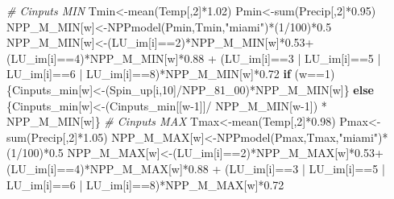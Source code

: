 \documentclass[
  10pt,
  b5paper,
]{book}
\newenvironment{Shaded}{\begin{snugshade}}{\end{snugshade}}
\newcommand{\CommentTok}[1]{\textcolor[rgb]{0.56,0.35,0.01}{\textit{#1}}}
\newcommand{\ControlFlowTok}[1]{\textcolor[rgb]{0.13,0.29,0.53}{\textbf{#1}}}
\newcommand{\DecValTok}[1]{\textcolor[rgb]{0.00,0.00,0.81}{#1}}
\newcommand{\FloatTok}[1]{\textcolor[rgb]{0.00,0.00,0.81}{#1}}
\newcommand{\FunctionTok}[1]{\textcolor[rgb]{0.00,0.00,0.00}{#1}}
\newcommand{\NormalTok}[1]{#1}
\newcommand{\OtherTok}[1]{\textcolor[rgb]{0.56,0.35,0.01}{#1}}
\newcommand{\SpecialCharTok}[1]{\textcolor[rgb]{0.00,0.00,0.00}{#1}}
\newcommand{\StringTok}[1]{\textcolor[rgb]{0.31,0.60,0.02}{#1}}
\begin{document}
\begin{Shaded}
\begin{Highlighting}[]
\CommentTok{\# Cinputs MIN}
\NormalTok{Tmin}\OtherTok{\textless{}{-}}\FunctionTok{mean}\NormalTok{(Temp[,}\DecValTok{2}\NormalTok{]}\SpecialCharTok{*}\FloatTok{1.02}\NormalTok{)}
\NormalTok{Pmin}\OtherTok{\textless{}{-}}\FunctionTok{sum}\NormalTok{(Precip[,}\DecValTok{2}\NormalTok{]}\SpecialCharTok{*}\FloatTok{0.95}\NormalTok{)}
\NormalTok{NPP\_M\_MIN[w]}\OtherTok{\textless{}{-}}\FunctionTok{NPPmodel}\NormalTok{(Pmin,Tmin,}\StringTok{"miami"}\NormalTok{)}\SpecialCharTok{*}\NormalTok{(}\DecValTok{1}\SpecialCharTok{/}\DecValTok{100}\NormalTok{)}\SpecialCharTok{*}\FloatTok{0.5}
\NormalTok{NPP\_M\_MIN[w]}\OtherTok{\textless{}{-}}\NormalTok{(LU\_im[i]}\SpecialCharTok{==}\DecValTok{2}\NormalTok{)}\SpecialCharTok{*}\NormalTok{NPP\_M\_MIN[w]}\SpecialCharTok{*}\FloatTok{0.53}\SpecialCharTok{+}\NormalTok{ (LU\_im[i]}\SpecialCharTok{==}\DecValTok{4}\NormalTok{)}\SpecialCharTok{*}\NormalTok{NPP\_M\_MIN[w]}\SpecialCharTok{*}\FloatTok{0.88} \SpecialCharTok{+}\NormalTok{ (LU\_im[i]}\SpecialCharTok{==}\DecValTok{3} \SpecialCharTok{|}\NormalTok{ LU\_im[i]}\SpecialCharTok{==}\DecValTok{5} \SpecialCharTok{|}\NormalTok{ LU\_im[i]}\SpecialCharTok{==}\DecValTok{6} \SpecialCharTok{|}\NormalTok{ LU\_im[i]}\SpecialCharTok{==}\DecValTok{8}\NormalTok{)}\SpecialCharTok{*}\NormalTok{NPP\_M\_MIN[w]}\SpecialCharTok{*}\FloatTok{0.72}
\ControlFlowTok{if}\NormalTok{ (w}\SpecialCharTok{==}\DecValTok{1}\NormalTok{) \{Cinputs\_min[w]}\OtherTok{\textless{}{-}}\NormalTok{(Spin\_up[i,}\DecValTok{10}\NormalTok{]}\SpecialCharTok{/}\NormalTok{NPP\_81\_00)}\SpecialCharTok{*}\NormalTok{NPP\_M\_MIN[w]\} }\ControlFlowTok{else}\NormalTok{ \{Cinputs\_min[w]}\OtherTok{\textless{}{-}}\NormalTok{(Cinputs\_min[[w}\DecValTok{{-}1}\NormalTok{]]}\SpecialCharTok{/}\NormalTok{ NPP\_M\_MIN[w}\DecValTok{{-}1}\NormalTok{]) }\SpecialCharTok{*}\NormalTok{ NPP\_M\_MIN[w]\} }
\CommentTok{\# Cinputs MAX}
\NormalTok{Tmax}\OtherTok{\textless{}{-}}\FunctionTok{mean}\NormalTok{(Temp[,}\DecValTok{2}\NormalTok{]}\SpecialCharTok{*}\FloatTok{0.98}\NormalTok{)}
\NormalTok{Pmax}\OtherTok{\textless{}{-}}\FunctionTok{sum}\NormalTok{(Precip[,}\DecValTok{2}\NormalTok{]}\SpecialCharTok{*}\FloatTok{1.05}\NormalTok{)}
\NormalTok{NPP\_M\_MAX[w]}\OtherTok{\textless{}{-}}\FunctionTok{NPPmodel}\NormalTok{(Pmax,Tmax,}\StringTok{"miami"}\NormalTok{)}\SpecialCharTok{*}\NormalTok{(}\DecValTok{1}\SpecialCharTok{/}\DecValTok{100}\NormalTok{)}\SpecialCharTok{*}\FloatTok{0.5}
\NormalTok{NPP\_M\_MAX[w]}\OtherTok{\textless{}{-}}\NormalTok{(LU\_im[i]}\SpecialCharTok{==}\DecValTok{2}\NormalTok{)}\SpecialCharTok{*}\NormalTok{NPP\_M\_MAX[w]}\SpecialCharTok{*}\FloatTok{0.53}\SpecialCharTok{+}\NormalTok{ (LU\_im[i]}\SpecialCharTok{==}\DecValTok{4}\NormalTok{)}\SpecialCharTok{*}\NormalTok{NPP\_M\_MAX[w]}\SpecialCharTok{*}\FloatTok{0.88} \SpecialCharTok{+}\NormalTok{ (LU\_im[i]}\SpecialCharTok{==}\DecValTok{3} \SpecialCharTok{|}\NormalTok{ LU\_im[i]}\SpecialCharTok{==}\DecValTok{5} \SpecialCharTok{|}\NormalTok{ LU\_im[i]}\SpecialCharTok{==}\DecValTok{6} \SpecialCharTok{|}\NormalTok{ LU\_im[i]}\SpecialCharTok{==}\DecValTok{8}\NormalTok{)}\SpecialCharTok{*}\NormalTok{NPP\_M\_MAX[w]}\SpecialCharTok{*}\FloatTok{0.72}

\end{Highlighting}
\end{Shaded}
\end{document}
